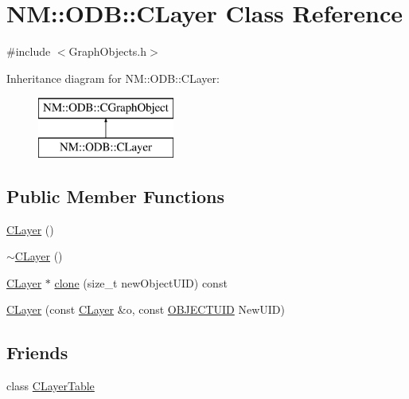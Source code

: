 \hypertarget{class_n_m_1_1_o_d_b_1_1_c_layer}{}\section{N\+M\+:\+:O\+D\+B\+:\+:C\+Layer Class Reference}
\label{class_n_m_1_1_o_d_b_1_1_c_layer}


{\ttfamily \#include $<$Graph\+Objects.\+h$>$}

Inheritance diagram for N\+M\+:\+:O\+D\+B\+:\+:C\+Layer\+:\begin{figure}[H]
\begin{center}
\leavevmode
\includegraphics[height=2.000000cm]{class_n_m_1_1_o_d_b_1_1_c_layer}
\end{center}
\end{figure}
\subsection*{Public Member Functions}
\begin{DoxyCompactItemize}
\item 
\hyperlink{class_n_m_1_1_o_d_b_1_1_c_layer_a7da458775eac06098198c388edcff3d3}{C\+Layer} ()
\item 
\hyperlink{class_n_m_1_1_o_d_b_1_1_c_layer_a9f2abe118101e0f4eed653fc3d6230a1}{$\sim$\+C\+Layer} ()
\item 
\hyperlink{class_n_m_1_1_o_d_b_1_1_c_layer}{C\+Layer} $\ast$ \hyperlink{class_n_m_1_1_o_d_b_1_1_c_layer_a683492260348c94f9f3660f55d1a2438}{clone} (size\+\_\+t new\+Object\+U\+I\+D) const 
\item 
\hyperlink{class_n_m_1_1_o_d_b_1_1_c_layer_ac8dfe4da12a1fcb05517ff4567b5e3bb}{C\+Layer} (const \hyperlink{class_n_m_1_1_o_d_b_1_1_c_layer}{C\+Layer} \&o, const \hyperlink{namespace_n_m_1_1_o_d_b_a262b64fab56baaa96e18bac4ada88265}{O\+B\+J\+E\+C\+T\+U\+I\+D} New\+U\+I\+D)
\end{DoxyCompactItemize}
\subsection*{Friends}
\begin{DoxyCompactItemize}
\item 
class \hyperlink{class_n_m_1_1_o_d_b_1_1_c_layer_acc9f3446da3623694f17d73565a728db}{C\+Layer\+Table}
\end{DoxyCompactItemize}
